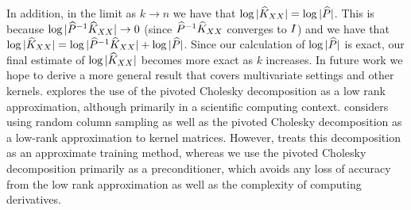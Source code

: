 In addition, in the limit as $k \rightarrow n$ we have that $\log \vert \widehat{K}_{XX} \vert = \log \vert \widehat{P} \vert$.
This is because $\log \vert \widehat{P}^{-1}\widehat{K}_{XX} \vert \rightarrow 0$ (since $\widehat{P}^{-1}\widehat{K}_{XX}$ converges to $I$) and we have that $\log \vert \widehat{K}_{XX} \vert = \log \vert \widehat{P}^{-1}\widehat{K}_{XX} \vert + \log \vert \widehat{P} \vert$.
Since our calculation of $\log \vert \widehat{P} \vert$ is exact, our final estimate of $\log \vert \widehat{K}_{XX} \vert$ becomes more exact as $k$ increases.
In future work we hope to derive a more general result that covers multivariate settings and other kernels.
%
\citet{harbrecht2012low} explores the use of the pivoted Cholesky decomposition as a low rank approximation, although primarily in a scientific computing context.
\citet{bach2013sharp} considers using random column sampling as well as the pivoted Cholesky decomposition as a low-rank approximation to kernel matrices.
However, \citet{bach2013sharp} treats this decomposition as an approximate training method, whereas we use the pivoted Cholesky decomposition primarily
as a preconditioner, which avoids any loss of accuracy from the low rank approximation as well as the complexity of computing derivatives.

